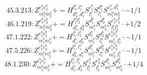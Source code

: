 \documentclass[letterpaper,10pt,fleqn,leqno,onecolumn]{article}
\begin{document}
\begin{equation} \;\;\;\;\;\;  45.3.213: Z^{e_{1}^{b}e_{2}^{b}}_{m_{1}^{b}m_{2}^{b}}+=H^{l_{1}^{b},l_{1}^{a}}_{d_{1}^{a},d_{1}^{b}}S^{e_{1}^{b}}_{l_{1}^{b}}S^{d_{1}^{a}}_{l_{1}^{a}}S^{e_{2}^{b},d_{1}^{b}}_{m_{1}^{b}m_{2}^{b}}\cdot -1/1 \end{equation}
\begin{equation} \;\;\;\;\;\;  46.1.219: Z^{e_{1}^{b}e_{2}^{b}}_{m_{1}^{b}m_{2}^{b}}+=H^{l_{1}^{b}l_{2}^{b}}_{d_{1}^{b},d_{2}^{b}}S^{d_{1}^{b}}_{m_{1}^{b}}S^{d_{2}^{b}}_{m_{2}^{b}}S^{e_{1}^{b}e_{2}^{b}}_{l_{1}^{b}l_{2}^{b}}\cdot +1/2 \end{equation}
\begin{equation} \;\;\;\;\;\;  47.1.222: Z^{e_{1}^{b}e_{2}^{b}}_{m_{1}^{b}m_{2}^{b}}+=H^{l_{1}^{b},l_{2}^{b}}_{d_{1}^{b},d_{2}^{b}}S^{d_{1}^{b}}_{m_{1}^{b}}S^{d_{2}^{b}}_{l_{1}^{b}}S^{e_{1}^{b}e_{2}^{b}}_{m_{2}^{b},l_{2}^{b}}\cdot -1/1 \end{equation}
\begin{equation} \;\;\;\;\;\;  47.5.226: Z^{e_{1}^{b}e_{2}^{b}}_{m_{1}^{b}m_{2}^{b}}+=H^{l_{1}^{a},l_{1}^{b}}_{d_{1}^{b},d_{1}^{a}}S^{d_{1}^{b}}_{m_{1}^{b}}S^{d_{1}^{a}}_{l_{1}^{a}}S^{e_{1}^{b}e_{2}^{b}}_{m_{2}^{b},l_{1}^{b}}\cdot -1/1 \end{equation}
\begin{equation} \;\;\;\;\;\;  48.1.230: Z^{e_{1}^{b}e_{2}^{b}}_{m_{1}^{b}m_{2}^{b}}+=H^{l_{1}^{b},l_{2}^{b}}_{d_{1}^{b},d_{2}^{b}}S^{e_{1}^{b}}_{l_{1}^{b}}S^{e_{2}^{b}}_{l_{2}^{b}}S^{d_{1}^{b}}_{m_{1}^{b}}S^{d_{2}^{b}}_{m_{2}^{b}}\cdot +1/4 \end{equation}
\end{document}
